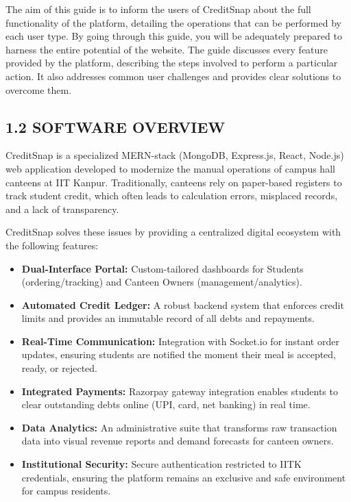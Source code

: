 \documentclass[a4paper,12pt]{article}
\begin{document}
The aim of this guide is to inform the users of CreditSnap about the full functionality of the platform, detailing the operations that can be performed by each user type. By going through this guide, you will be adequately prepared to harness the entire potential of the website. The guide discusses every feature provided by the platform, describing the steps involved to perform a particular action. It also addresses common user challenges and provides clear solutions to overcome them.

\subsection*{1.2 SOFTWARE OVERVIEW}
\label{sec:software}

CreditSnap is a specialized MERN-stack (MongoDB, Express.js, React, Node.js) web application developed to modernize the manual operations of campus hall canteens at IIT Kanpur. Traditionally, canteens rely on paper-based registers to track student credit, which often leads to calculation errors, misplaced records, and a lack of transparency.

CreditSnap solves these issues by providing a centralized digital ecosystem with the following features:

\begin{itemize}
    \item \textbf{Dual-Interface Portal:} Custom-tailored dashboards for Students (ordering/tracking) and Canteen Owners (management/analytics).
    \item \textbf{Automated Credit Ledger:} A robust backend system that enforces credit limits and provides an immutable record of all debts and repayments.
    \item \textbf{Real-Time Communication:} Integration with Socket.io for instant order updates, ensuring students are notified the moment their meal is accepted, ready, or rejected.
    \item \textbf{Integrated Payments:} Razorpay gateway integration enables students to clear outstanding debts online (UPI, card, net banking) in real time.
    \item \textbf{Data Analytics:} An administrative suite that transforms raw transaction data into visual revenue reports and demand forecasts for canteen owners.
    \item \textbf{Institutional Security:} Secure authentication restricted to IITK credentials, ensuring the platform remains an exclusive and safe environment for campus residents.
\end{itemize}
\end{document}
